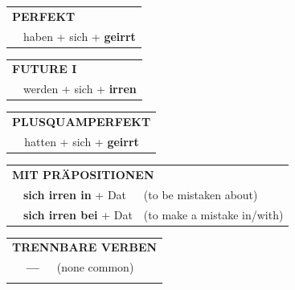\documentclass[10pt,a4paper]{revtex4-2}
\begin{document}
\begin{verbbox}
 \begin{tabular}{rl}
     \multicolumn{2}{l}{\textbf{PERFEKT}}\\
   & haben + sich + \textbf{geirrt}\\
  \end{tabular}
\hfill
   \begin{tabular}{rl}
    \multicolumn{2}{l}{\textbf{FUTURE I} }\\
   & werden + sich + \textbf{irren}\\
  \end{tabular}
\hfill
   \begin{tabular}{rl}
      \multicolumn{2}{l}{\textbf{PLUSQUAMPERFEKT}}\\
   & hatten + sich + \textbf{geirrt}\\
  \end{tabular}

   \vspace{10pt}

   \begin{tabular}{lll}
      \multicolumn{3}{l}{\textbf{MIT PRÄPOSITIONEN}}\\
& \textbf{sich irren in} + Dat & (to be mistaken about)\\
& \textbf{sich irren bei} + Dat & (to make a mistake in/with)\\
\end{tabular}
  \hfill
   \begin{tabular}{lll}
      \multicolumn{3}{l}{\textbf{TRENNBARE VERBEN}}\\
 & \textbf{---} & (none common)\\
\vspace{10pt}
  \end{tabular}

  \vspace{-5pt}

\end{verbbox}
\end{document}
